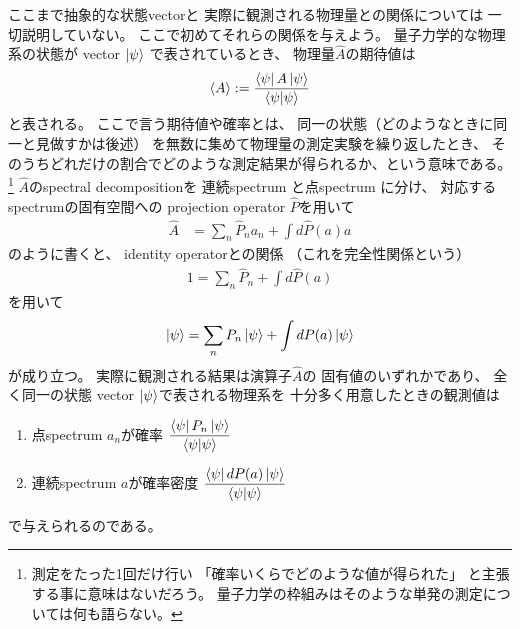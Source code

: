 ここまで抽象的な状態vectorと
実際に観測される物理量との関係については
一切説明していない。
ここで初めてそれらの関係を与えよう。
量子力学的な物理系の状態が
vector $\ket{\psi}$
で表されているとき、
物理量$\hat{A}$の期待値は
\begin{align}
    \braket{A} :=
    \dfrac{
        \bra{\psi} A \ket{\psi}
    }{
        \braket{\psi|\psi}
    }
\end{align}
と表される。
ここで言う期待値や確率とは、
同一の状態（どのようなときに同一と見做すかは後述）
を無数に集めて物理量の測定実験を繰り返したとき、
そのうちどれだけの割合でどのような測定結果が得られるか、という意味である。
\footnote{
    測定をたった1回だけ行い
    「確率いくらでどのような値が得られた」
    と主張する事に意味はないだろう。
    量子力学の枠組みはそのような単発の測定については何も語らない。
}
$\hat{A}$のspectral decompositionを
連続spectrum と点spectrum に分け、
対応するspectrumの固有空間への
projection operator $\hat{P}$を用いて
\begin{align}
    \hat{A} &=
    \sum_n { \hat{P}_n a_n }
    +
    \int d \hat{P} (a) a
\end{align}
のように書くと、
identity operatorとの関係
（これを完全性関係という）
\begin{align}
    1 =
    \sum_n \hat{P}_n
    +
    \int d \hat{P} (a)
\label{spectral decomposition of identity}
\end{align}
を用いて
\begin{align}
    \ket{\psi} =
    \sum_n P_n \ket{\psi}
    +
    \int d P (a) \ket{\psi}
\end{align}
が成り立つ。
実際に観測される結果は演算子$\hat{A}$の
固有値のいずれかであり、
全く同一の状態 vector $\ket{\psi}$で表される物理系を
十分多く用意したときの観測値は
\begin{enumerate}
    \item{点spectrum $a_n$が確率
    $
    \dfrac{
        \bra{\psi} P_n \ket{\psi}
    }{
     \braket{\psi|\psi}
    }
    $}
    \item{連続spectrum $a$が確率密度
    $
    \dfrac{
        \bra{\psi} d P(a) \ket{\psi}
    }{
     \braket{\psi|\psi}
    }
    $}
\end{enumerate}
で与えられるのである。

